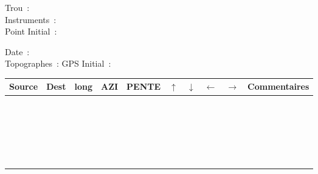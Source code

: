 \documentclass[11pt]{article}
\author{v45h}
\date{\today}
\title{}
\begin{document}
   \begin{minipage}{0.40\linewidth}
     Trou~:\\
     Instruments~:\\
     Point Initial~:
   \end{minipage}\hfill
   \begin{minipage}{0.48\linewidth}   
     Date~:\\
     Topographes~:
     GPS Initial~:
\end{minipage}


\begin{center}
\begin{tabular}{|m{1cm}|m{1cm}|m{1cm}|m{1cm}|m{1.2cm}|m{1cm}|m{1cm}|m{1cm}|m{1cm}|m{6cm}|}
\hline
Source & Dest & long & AZI & PENTE & $\uparrow$ & $\downarrow$ & $\leftarrow$ & $\rightarrow$ & Commentaires\\
\hline
 &  &  &  &  &  &  &  &  & \\
\hline
 &  &  &  &  &  &  &  &  & \\
\hline
 &  &  &  &  &  &  &  &  & \\
\hline
 &  &  &  &  &  &  &  &  & \\
\hline
 &  &  &  &  &  &  &  &  & \\
\hline
 &  &  &  &  &  &  &  &  & \\
\hline
 &  &  &  &  &  &  &  &  & \\
\hline
 &  &  &  &  &  &  &  &  & \\
\hline
 &  &  &  &  &  &  &  &  & \\
\hline
 &  &  &  &  &  &  &  &  & \\
\hline
 &  &  &  &  &  &  &  &  & \\
\hline
 &  &  &  &  &  &  &  &  & \\
\hline
 &  &  &  &  &  &  &  &  & \\
\hline
 &  &  &  &  &  &  &  &  & \\
\hline
 &  &  &  &  &  &  &  &  & \\
\hline
 &  &  &  &  &  &  &  &  & \\
\hline
 &  &  &  &  &  &  &  &  & \\
\hline
 &  &  &  &  &  &  &  &  & \\
\hline
 &  &  &  &  &  &  &  &  & \\
\hline
 &  &  &  &  &  &  &  &  & \\
\hline
 &  &  &  &  &  &  &  &  & \\
\hline
 &  &  &  &  &  &  &  &  & \\
\hline
 &  &  &  &  &  &  &  &  & \\

\end{tabular}
\end{center}
\end{document}
